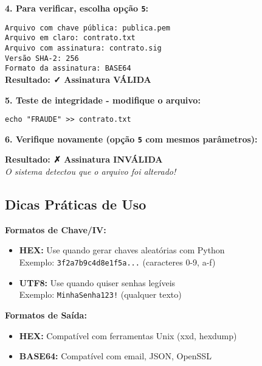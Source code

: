 \documentclass[12pt,a4paper]{article}
\begin{document}
\textbf{4. Para verificar, escolha opção \texttt{5}:}

\begin{tcolorbox}[colback=codebg,colframe=gray!50]
\footnotesize
\texttt{Arquivo com chave pública: publica.pem}\\
\texttt{Arquivo em claro: contrato.txt}\\
\texttt{Arquivo com assinatura: contrato.sig}\\
\texttt{Versão SHA-2: 256}\\
\texttt{Formato da assinatura: BASE64}\\[0.5em]
\textcolor{successgreen}{\textbf{Resultado: ✓ Assinatura VÁLIDA}}
\end{tcolorbox}

\textbf{5. Teste de integridade - modifique o arquivo:}

\begin{lstlisting}[style=bashstyle]
echo "FRAUDE" >> contrato.txt
\end{lstlisting}

\textbf{6. Verifique novamente (opção \texttt{5} com mesmos parâmetros):}

\begin{tcolorbox}[colback=dangerred!10,colframe=dangerred]
\footnotesize
\textcolor{dangerred}{\textbf{Resultado: ✗ Assinatura INVÁLIDA}}\\
\textit{O sistema detectou que o arquivo foi alterado!}
\end{tcolorbox}

\subsection{Dicas Práticas de Uso}

\begin{infobox}
\textbf{Formatos de Chave/IV:}
\begin{itemize}
    \item \textbf{HEX:} Use quando gerar chaves aleatórias com Python\\
    \quad Exemplo: \texttt{3f2a7b9c4d8e1f5a...} (caracteres 0-9, a-f)
    \item \textbf{UTF8:} Use quando quiser senhas legíveis\\
    \quad Exemplo: \texttt{MinhaSenha123!} (qualquer texto)
\end{itemize}
\end{infobox}

\begin{infobox}
\textbf{Formatos de Saída:}
\begin{itemize}
    \item \textbf{HEX:} Compatível com ferramentas Unix (xxd, hexdump)
    \item \textbf{BASE64:} Compatível com email, JSON, OpenSSL
\end{itemize}
\end{infobox}
\end{document}
